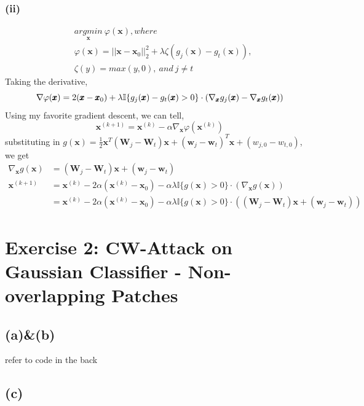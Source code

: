 \documentclass[11pt]{article}
\begin{document}
\subsubsection*{(ii)}
\begin{equation}
\begin{split}
&\underset{\pmb{x}}{argmin}\ \varphi(\pmb{x}), where\\
&\varphi(\pmb{x})=||\pmb{x}-\pmb{x}_0||^2_2+\lambda\zeta(g_j(\pmb{x})-g_t(\pmb{x})),\\
&\zeta(y)=max(y,0),\ and\ j\ne t
\end{split}
\end{equation}
Taking the derivative,
\begin{equation}
\nabla \varphi(\pmb{x}) = 2(\pmb{x}-\pmb{x}_0)+\lambda\mathbb{I}\{g_j(\pmb{x})-g_t(\pmb{x}) > 0\}\cdot(\nabla_{\pmb{x}}g_j(\pmb{x})-\nabla_{\pmb{x}}g_t(\pmb{x}))\\
\end{equation}
Using my favorite gradient descent, we can tell,
\begin{equation}
\pmb{x}^{(k+1)}=\pmb{x}^{(k)}-\alpha\nabla_{\pmb{x}}\varphi(\pmb{x}^{(k)})
\end{equation}
substituting in $g(\pmb{x})=\frac{1}{2}\pmb{x}^T(\pmb{W}_j-\pmb{W}_t)\pmb{x}+(\pmb{w}_j-\pmb{w}_t)^T\pmb{x}+(w_{j,0}-w_{t,0})$,
we get 
\begin{equation}
\begin{split}
\nabla_{\pmb{x}}g(\pmb{x})&=(\pmb{W}_j-\pmb{W}_t)\pmb{x}+(\pmb{w}_j-\pmb{w}_t)\\
\pmb{x}^{(k+1)}&=\pmb{x}^{(k)}-2\alpha(\pmb{x}^{(k)}-\pmb{x}_0)-\alpha\lambda\mathbb{I}\{g(\pmb{x}) > 0\}\cdot(\nabla_{\pmb{x}}g(\pmb{x}))\\
&=\pmb{x}^{(k)}-2\alpha(\pmb{x}^{(k)}-\pmb{x}_0)-\alpha\lambda\mathbb{I}\{g(\pmb{x}) > 0\}\cdot((\pmb{W}_j-\pmb{W}_t)\pmb{x}+(\pmb{w}_j-\pmb{w}_t))
\end{split}
\end{equation}
\section*{Exercise 2: CW-Attack on Gaussian Classifier - Non-overlapping Patches} 
\subsection*{(a)\&(b)}
refer to code in the back
\subsection*{(c)}
\end{document}
